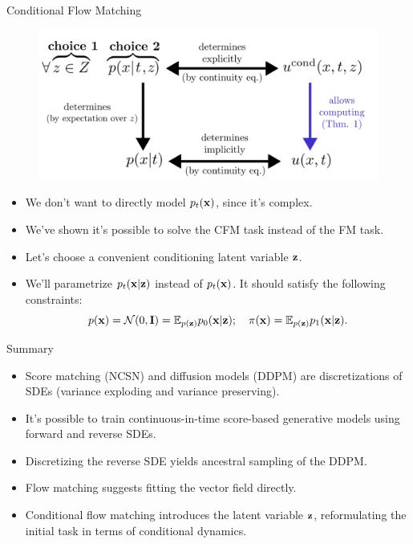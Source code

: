 \documentclass{beamer}
\begin{document}
\begin{frame}{Conditional Flow Matching}
	\begin{figure}
		\centering
		\includegraphics[width=0.75\linewidth]{figs/cfm_uncond_to_cond}
	\end{figure}
    \eqpause
	\begin{itemize}
		\item We don't want to directly model $p_t(\mathbf{x})$, since it's complex.
		\item We've shown it's possible to solve the CFM task instead of the FM task.
		\item Let's choose a convenient conditioning latent variable $\mathbf{z}$.
		\item We'll parametrize $p_t(\mathbf{x} | \mathbf{z})$ instead of $p_t(\mathbf{x})$. It should satisfy the following constraints:
		\[
			p(\mathbf{x}) = \mathcal{N}(0, \mathbf{I}) = \mathbb{E}_{p(\mathbf{z})} p_0(\mathbf{x} | \mathbf{z}); \quad \pi(\mathbf{x}) = \mathbb{E}_{p(\mathbf{z})} p_1(\mathbf{x} | \mathbf{z}).
		\]
	\end{itemize}
\end{frame}
\begin{frame}{Summary}
	\begin{itemize}
		\item Score matching (NCSN) and diffusion models (DDPM) are discretizations of SDEs (variance exploding and variance preserving).
		\vfill
		\item It's possible to train continuous-in-time score-based generative models using forward and reverse SDEs.
		\vfill
		\item Discretizing the reverse SDE yields ancestral sampling of the DDPM.
		\vfill
		\item Flow matching suggests fitting the vector field directly.
		\vfill 
		\item Conditional flow matching introduces the latent variable $\mathbf{z}$, reformulating the initial task in terms of conditional dynamics.
	\end{itemize}
\end{frame}
\end{document}
